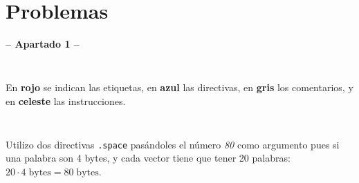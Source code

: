 \documentclass[a4paper]{report}
\begin{document}
\chapter{Problemas}


\begin{center}
    \Large\textbf{-- Apartado 1 --}
\end{center}

\section{}

\inputminted{mips}{src/problemas/1.asm}

En \textcolor{autumn-red-pyg}{\textbf{rojo}} se indican las etiquetas, en \textcolor{autumn-blue-pyg}{\textbf{azul}} las directivas, en \textcolor{autumn-gray-pyg}{\textbf{gris}} los comentarios, y en \textcolor{autumn-teal-pyg}{\textbf{celeste}} las instrucciones.

\section{}

\inputminted{mips}{src/problemas/2.asm}

Utilizo dos directivas \texttt{.space} pasándoles el número \textit{80} como argumento pues si una palabra son 4 bytes, y cada vector tiene que tener 20 palabras: $20 \cdot 4\;\text{bytes} = 80\;\text{bytes}$.

\section{}

\inputminted{mips}{src/problemas/3.asm}


\section{}

\inputminted{mips}{src/problemas/4.asm}


\section{}

\inputminted[breaklines, breakbytokenanywhere]{mips}{src/problemas/5.asm}


\section{}
\end{document}
